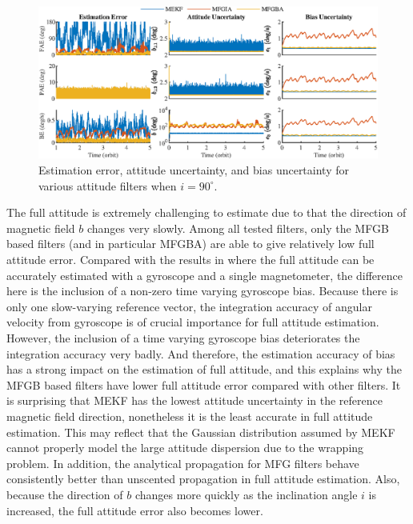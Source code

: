 \begin{figure}
	\centering
	\includegraphics[scale=0.97]{figures/attEst-sim3-error-i90}
	\caption{Estimation error, attitude uncertainty, and bias uncertainty for various attitude filters when $i=90^\circ$.}
	\label{fig:attEst-sim3-error-i90}
\end{figure}

The full attitude is extremely challenging to estimate due to that the direction of magnetic field $b$ changes very slowly.
Among all tested filters, only the MFGB based filters (and in particular MFGBA) are able to give relatively low full attitude error.
Compared with the results in \cite{lee2019spacecraft} where the full attitude can be accurately estimated with a gyroscope and a single magnetometer, the difference here is the inclusion of a non-zero time varying gyroscope bias.
Because there is only one slow-varying reference vector, the integration accuracy of angular velocity from gyroscope is of crucial importance for full attitude estimation.
However, the inclusion of a time varying gyroscope bias deteriorates the integration accuracy very badly.
And therefore, the estimation accuracy of bias has a strong impact on the estimation of full attitude, and this explains why the MFGB based filters have lower full attitude error compared with other filters.
It is surprising that MEKF has the lowest attitude uncertainty in the reference magnetic field direction, nonetheless it is the least accurate in full attitude estimation.
This may reflect that the Gaussian distribution assumed by MEKF cannot properly model the large attitude dispersion due to the wrapping problem.
In addition, the analytical propagation for MFG filters behave consistently better than unscented propagation in full attitude estimation.
Also, because the direction of $b$ changes more quickly as the inclination angle $i$ is increased, the full attitude error also becomes lower.

